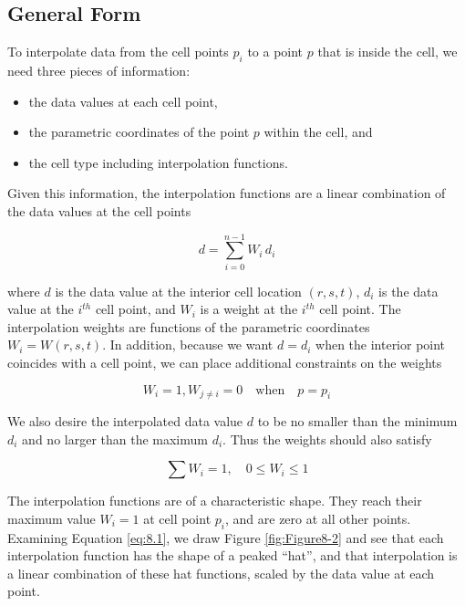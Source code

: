 \subsection{General Form}

To interpolate data from the cell points $p_i$ to a point $p$ that is inside the cell, we need three pieces of information:

\begin{itemize}

    \item the data values at each cell point,

    \item the parametric coordinates of the point $p$ within the cell, and

    \item the cell type including interpolation functions.

\end{itemize}

Given this information, the interpolation functions are a linear combination of the data values at the cell points

\begin{equation}\label{eq:8.4}
d = \sum_{i = 0}^{n - 1}W_i\,  d_i
\end{equation}

where $d$ is the data value at the interior cell location $(r,s,t)$, $d_i$ is the data value at the $i^{th}$ cell point, and $W_i$ is a weight at the $i^{th}$ cell point. The interpolation weights are functions of the parametric coordinates $W_i = W(r,s,t)$. In addition, because we want $d = d_i$ when the interior point coincides with a cell point, we can place additional constraints on the weights

\begin{equation}\label{eq:8.5}
W_i = 1, W_{j \neq i} = 0 \quad \text{when} \quad p = p_i
\end{equation}

We also desire the interpolated data value $d$ to be no smaller than the minimum $d_i$ and no larger than the maximum $d_i$. Thus the weights should also satisfy

\begin{equation}\label{eq:8.6}
\sum W_i = 1, \quad 0 \leq W_i \leq 1
\end{equation}

The interpolation functions are of a characteristic shape. They reach their maximum value $W_i = 1$ at cell point $p_i$, and are zero at all other points. Examining Equation \ref{eq:8.1}, we draw Figure \ref{fig:Figure8-2} and see that each interpolation function has the shape of a peaked ``hat'', and that interpolation is a linear combination of these hat functions, scaled by the data value at each point.

